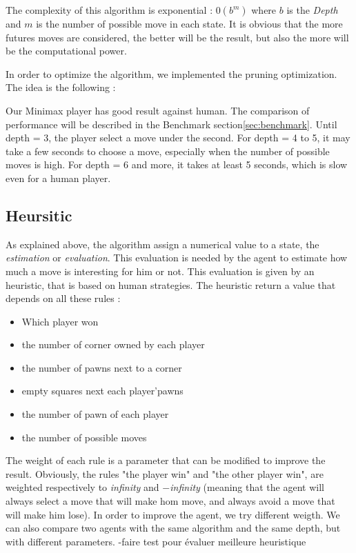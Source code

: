 \documentclass{article}
\begin{document}
The complexity of this algorithm is exponential : $0(b^m)$ where $b$ is the \textit{Depth} and $m$ is the number of possible move in each state.
It is obvious that the more futures moves are considered, the better will be the result, but also the more will be the computational power.

In order to optimize the algorithm, we implemented the pruning optimization. The idea is the following :

Our Minimax player has good result against human. The comparison of performance will be described in the Benchmark section\ref{sec:benchmark}.
Until depth = 3, the player select a move under the second.
For depth = 4 to 5, it may take a few seconds to choose a move, especially when the number of possible moves is high.
For depth = 6 and more, it takes at least 5 seconds, which is slow even for a human player.

\subsection{Heursitic}
As explained above, the algorithm assign a numerical value to a state, the \textit{estimation} or \textit{evaluation}. This evaluation is needed by the agent to estimate how much a move is interesting for him %
or not. This evaluation is given by an heuristic, that is based on human strategies.
The heuristic return a value that depends on all these rules :
\begin{itemize}
    \item Which player won
    \item the number of corner owned by each player
    \item the number of pawns next to a corner
    \item empty squares next each player'pawns
    \item the number of pawn of each player
    \item the number of possible moves
\end{itemize}
The weight of each rule is a parameter that can be modified to improve the result. Obviously, the rules "the player win" and "the other player win", are weighted respectively
to \textit{infinity} and $-$\textit{infinity} (meaning that the agent will always select a move that will make hom move, and always avoid a move that will make him lose).
In order to improve the agent, we try different weigth. We can also compare two agents with the same algorithm and the same depth, but with different parameters.
 -faire test pour évaluer meilleure heuristique
\end{document}
